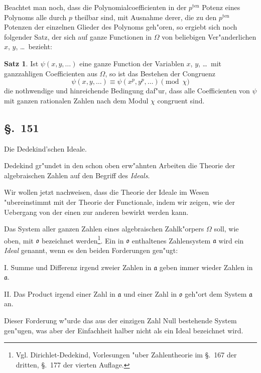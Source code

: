 \documentclass[12pt,a4paper]{article}
\theoremstyle{definition}
\newtheorem*{satz}{Satz}
\begin{document}
Beachtet man noch, dass die Polynomialcoefficienten in der $p^{\text{ten}}$ Potenz eines Polynoms alle durch $p$ theilbar sind, mit Ausnahme derer, die zu den $p^{\text{ten}}$ Potenzen der einzelnen Glieder des Polynoms geh"oren, so ergiebt sich noch folgender Satz, der sich auf ganze Functionen in $\Omega$ von beliebigen Ver"anderlichen $x$, $y$, \dots\ bezieht:

\begin{satz}
Ist $\psi(x, y, \dots)$ eine ganze Function der Variablen $x$, $y$, \dots\ mit ganzzahligen Coefficienten aus $\Omega$, so ist das Bestehen der Congruenz
\begin{equation}
\psi(x, y, \dots) \equiv \psi(x^p, y^p, \dots) \pmod{\chi}
\end{equation}
die nothwendige und hinreichende Bedingung daf"ur, dass alle Coefficienten von $\psi$ mit ganzen rationalen Zahlen nach dem Modul $\chi$ congruent sind.
\end{satz}


\subsection*{\S.~151}

Die Dedekind'schen Ideale.

Dedekind gr"undet in den schon oben erw"ahnten Arbeiten die Theorie der algebraischen Zahlen auf den Begriff des \emph{Ideals}.

Wir wollen jetzt nachweisen, dass die Theorie der Ideale im Wesen "ubereinstimmt mit der Theorie der Functionale, indem wir zeigen, wie der Uebergang von der einen zur anderen bewirkt werden kann.

Das System aller ganzen Zahlen eines algebraischen Zahlk"orpers $\Omega$ soll, wie oben, mit $\mathfrak{o}$ bezeichnet werden\footnote{Vgl. Dirichlet-Dedekind, Vorlesungen "uber Zahlentheorie im \S.~167 der dritten, \S.~177 der vierten Auflage.}. Ein in $\mathfrak{o}$ enthaltenes Zahlensystem $\mathfrak{a}$ wird ein \emph{Ideal} genannt, wenn es den beiden Forderungen gen"ugt:

I. Summe und Differenz irgend zweier Zahlen in $\mathfrak{a}$ geben immer wieder Zahlen in $\mathfrak{a}$.

II. Das Product irgend einer Zahl in $\mathfrak{a}$ und einer Zahl in $\mathfrak{o}$ geh"ort dem System $\mathfrak{a}$ an.

Dieser Forderung w"urde das aus der einzigen Zahl Null bestehende System gen"ugen, was aber der Einfachheit halber nicht als ein Ideal bezeichnet wird.
\end{document}
